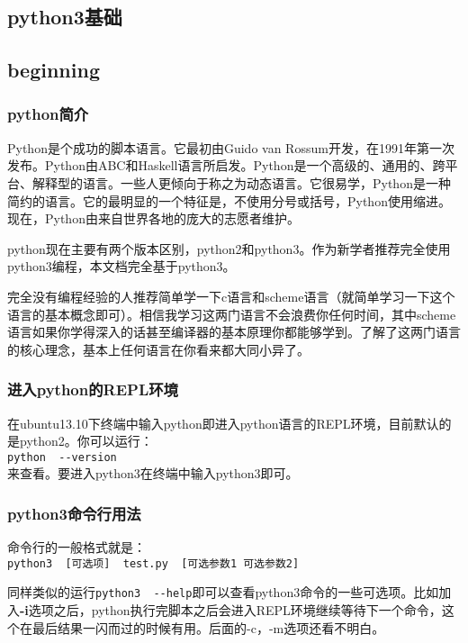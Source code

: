\documentclass[12pt,oneside]{book}
\begin{document}
\begin{common-format}
\mainmatter

\part{python3基础}

\chapter{beginning}
\section{python简介}
Python是个成功的脚本语言。它最初由Guido van Rossum开发，在1991年第一次发布。Python由ABC和Haskell语言所启发。Python是一个高级的、通用的、跨平台、解释型的语言。一些人更倾向于称之为动态语言。它很易学，Python是一种简约的语言。它的最明显的一个特征是，不使用分号或括号，Python使用缩进。现在，Python由来自世界各地的庞大的志愿者维护。

python现在主要有两个版本区别，python2和python3。作为新学者推荐完全使用python3编程，本文档完全基于python3。

完全没有编程经验的人推荐简单学一下c语言和scheme语言（就简单学习一下这个语言的基本概念即可）。相信我学习这两门语言不会浪费你任何时间，其中scheme语言如果你学得深入的话甚至编译器的基本原理你都能够学到。了解了这两门语言的核心理念，基本上任何语言在你看来都大同小异了。

\section{进入python的REPL环境}
在ubuntu13.10下终端中输入python即进入python语言的REPL环境，目前默认的是python2。你可以运行：\\
\verb+python  --version+\\
来查看。要进入python3在终端中输入python3即可。


\section{python3命令行用法}
命令行的一般格式就是：\\
\verb+python3  [可选项]  test.py  [可选参数1 可选参数2]+

同样类似的运行\verb+python3  --help+即可以查看python3命令的一些可选项。比如加入\textbf{-i}选项之后，python执行完脚本之后会进入REPL环境继续等待下一个命令，这个在最后结果一闪而过的时候有用。后面的-c，-m选项还看不明白。


\end{common-format}
\end{document}
